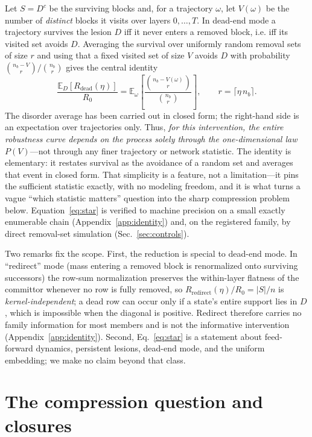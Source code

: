 \documentclass[aps,pre,twocolumn,superscriptaddress,floatfix,longbibliography]{revtex4-2}
\begin{document}
Let $S=D^{c}$ be the surviving blocks and, for a trajectory $\omega$, let
$V(\omega)$ be the number of \emph{distinct} blocks it visits over layers
$0,\dots,T$. In dead-end mode a trajectory survives the lesion $D$ iff it never
enters a removed block, i.e. iff its visited set avoids $D$. Averaging the survival
over uniformly random removal sets of size $r$ and using that a fixed visited set of
size $V$ avoids $D$ with probability $\binom{n_b-V}{r}/\binom{n_b}{r}$ gives the
central identity
\begin{equation}
\frac{\mathbb{E}_D\!\left[R_{\mathrm{dead}}(\eta)\right]}{R_0}
= \mathbb{E}_\omega\!\left[\frac{\binom{n_b-V(\omega)}{r}}{\binom{n_b}{r}}\right],
\qquad r=\lceil \eta\, n_b\rceil .
\label{eq:star}
\end{equation}
The disorder average has been carried out in closed form; the right-hand side is an
expectation over trajectories only. Thus, \emph{for this intervention, the entire
robustness curve depends on the process solely through the one-dimensional law
$P(V)$}---not through any finer trajectory or network statistic. The identity is
elementary: it restates survival as the avoidance of a random set and averages that
event in closed form. That simplicity is a feature, not a limitation---it pins the
sufficient statistic exactly, with no modeling freedom, and it is what turns a vague
``which statistic matters'' question into the sharp compression problem below.
Equation~\eqref{eq:star} is verified to machine precision on a small exactly
enumerable chain (Appendix~\ref{app:identity}) and, on the registered family, by
direct removal-set simulation (Sec.~\ref{sec:controls}).

Two remarks fix the scope. First, the reduction is special to dead-end mode. In
``redirect'' mode (mass entering a removed block is renormalized onto surviving
successors) the row-sum normalization preserves the within-layer flatness of the
committor whenever no row is fully removed, so $R_{\mathrm{redirect}}(\eta)/R_0=|S|/n$
is \emph{kernel-independent}; a dead row can occur only if a state's entire support
lies in $D$, which is impossible when the diagonal is positive. Redirect therefore
carries no family information for most members and is not the informative
intervention (Appendix~\ref{app:identity}). Second, Eq.~\eqref{eq:star} is a
statement about feed-forward dynamics, persistent lesions, dead-end mode, and the
uniform embedding; we make no claim beyond that class.

\section{The compression question and closures}
\label{sec:compression}
\end{document}
